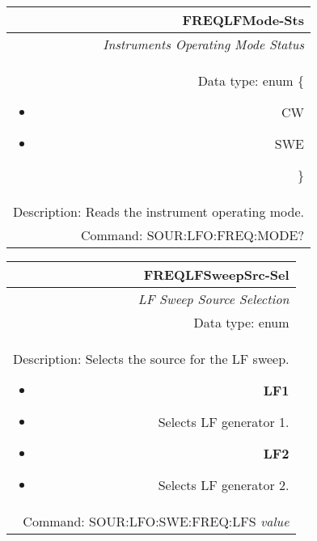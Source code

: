 \documentclass[openany]{article}
\begin{document}
		\begin{tabular}{N}
			\hline
			\bfseries FREQLFMode-Sts \\ \hline
			\emph{Instruments Operating Mode Status} \\
			Data type: enum \{\begin{itemize}[noitemsep]
				\small
				\item[] CW
				\item[] SWE
			\end{itemize}\} \\ 
			Description: Reads the instrument operating mode. \\
			Command: SOUR:LFO:FREQ:MODE? \\

		\end{tabular}
%
		\begin{tabular}{N}
			\hline
			\bfseries FREQLFSweepSrc-Sel \\ \hline
			\emph{LF Sweep Source Selection} \\
			Data type: enum \\
			Description: Selects the source for the LF sweep.\begin{itemize}[noitemsep]
				\small
				\item[] \textbf{LF1} 
				\item[] Selects LF generator 1.
				\item[] \textbf{LF2}
				\item[] Selects LF generator 2.
			\end{itemize} \\
			Command: SOUR:LFO:SWE:FREQ:LFS \emph{value} \\

		\end{tabular}
\end{document}
